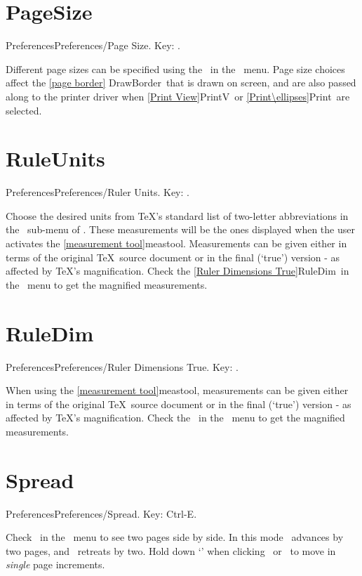 \newpage

\section{PageSize}{Preferences}Preferences/Page Size. Key: \none.

Different page sizes can be specified using the \ in the
\ menu. Page size choices affect the \ref{page border}
{DrawBorder}\ that is drawn on screen, and are also
passed along to the printer driver when \ref{Print View}{PrintV}\ or
\ref{Print\ellipses}{Print}\ are selected.
   \bigskip

\section{RuleUnits}{Preferences}Preferences/Ruler Units. Key: \none.

Choose the desired units from \TeX's standard list of two-letter
abbreviations in the \ sub-menu of .
These measurements will be the ones displayed when the user activates
the \ref{measurement tool}{meastool}.  Measurements can be given either
in terms of the original \TeX\ source document or in the final (`true')
version - as affected by \TeX's magnification.  Check the \ref{Ruler
Dimensions True}{RuleDim}\ in the \ menu to get the
magnified measurements.
   \bigskip

\section{RuleDim}{Preferences}Preferences/Ruler Dimensions True. Key: \none.

When using the \ref{measurement tool}{meastool}, measurements can be given
either in terms of the original \TeX\ source document or in the final (`true')
version - as affected by \TeX's magnification.  Check the
\ in the \ menu to get
the magnified measurements.
   \bigskip

\newpage   
   
\section{Spread}{Preferences}Preferences/Spread. Key: Ctrl-E.

Check \ in the \ menu to see two pages side by
side.  In this mode \ advances by two pages, and
\ retreats by two.  Hold down `' when clicking
\ or \ to move in {\it single\/} page increments.
   \bigskip


